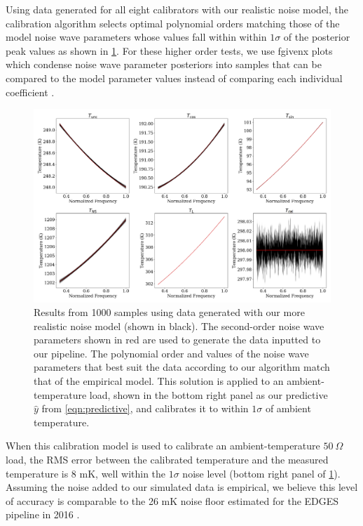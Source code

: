 Using data generated for all eight calibrators with our realistic noise model, the calibration algorithm selects optimal polynomial orders matching those of the model noise wave parameters whose values fall within within $1\sigma$ of the posterior peak values as shown in \cref{fig:fgxSamples}. For these higher order tests, we use fgivenx plots which condense noise wave parameter posteriors into samples that can be compared to the model parameter values instead of comparing each individual coefficient \citep{fgx}.
\begin{figure}
    \centering
    \includegraphics[width=\textwidth]{fgxSamples}
    \caption{Results from 1000 samples using data generated with our more realistic noise model (shown in black). The second-order noise wave parameters shown in red are used to generate the data inputted to our pipeline. The polynomial order and values of the noise wave parameters that best suit the data according to our algorithm match that of the empirical model. This solution is applied to an ambient-temperature load, shown in the bottom right panel as our predictive $\hat{y}$ from \cref{eqn:predictive}, and calibrates it to within $1\sigma$ of ambient temperature. \label{fig:fgxSamples}}
\end{figure}

When this calibration model is used to calibrate an ambient-temperature $50 \ \Omega$ load, the RMS error between the calibrated temperature and the measured temperature is 8 mK, well within the $1\sigma$ noise level (bottom right panel of \cref{fig:fgxSamples}). Assuming the noise added to our simulated data is empirical, we believe this level of accuracy is comparable to the 26 mK noise floor estimated for the EDGES pipeline in 2016 \citep{edgesCal}.


